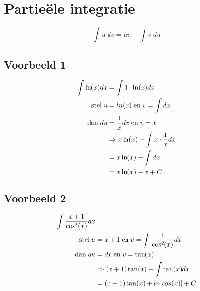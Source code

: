 \documentclass[12pt]{report}
\begin{document}
\section{Partieële integratie}
$$\int u\;dv = uv - \int v\;du$$
\subsection{Voorbeeld 1}
\begin{equation*}
	\begin{split}
		\int \ln(x) dx & = \int 1\cdot \ln(x) dx \\
		\hbox{stel}\; u & = ln(x) \; \hbox{en}\; v = \int dx\\
		\hbox{dan}\; du & = \frac{1}{x}dx \; \hbox{en}\; v = x\\
		& \Rightarrow x\ln(x) - \int x\cdot\frac{1}{x}dx\\
		& = x\ln(x) - \int dx\\
		& = x\ln(x) - x + C
	\end{split}
\end{equation*}
\subsection{Voorbeeld 2}
\begin{equation*}
	\begin{split}
		\int \frac{x + 1}{\cos^2(x)}dx & \\
		\hbox{stel}\; u & = x + 1 \; \hbox{en}\; v = \int \frac{1}{\cos^2(x)}dx\\
		\hbox{dan}\; du & = dx \; \hbox{en}\; v = \tan(x) \\
		& \Rightarrow (x+1)\tan(x) - \int \tan(x)dx  \\
		& = (x+1)\tan(x) + ln|cos(x)| + C  \\
	\end{split}
\end{equation*}
\end{document}
